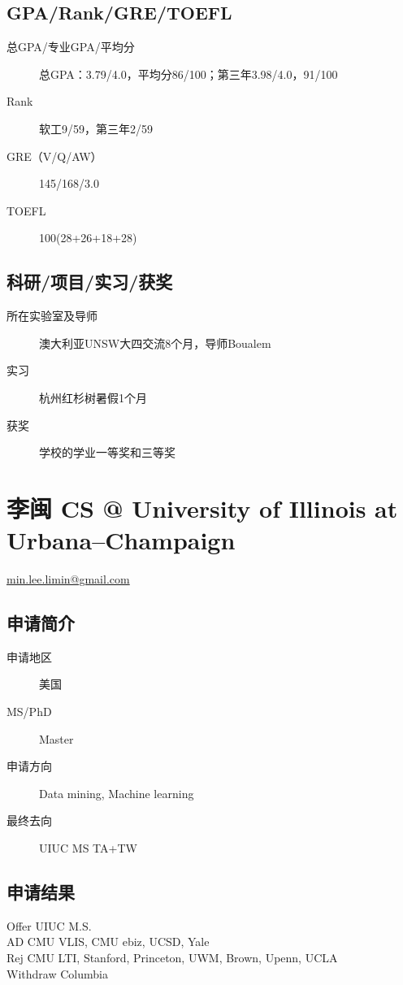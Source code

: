 \documentclass[11pt,fleqn,openany]{book} %
\begin{document}
\subsection*{GPA/Rank/GRE/TOEFL}
\begin{description}
\item[总GPA/专业GPA/平均分] 总GPA：3.79/4.0，平均分86/100；第三年3.98/4.0，91/100
\item[Rank] 软工9/59，第三年2/59
\item[GRE（V/Q/AW）] 145/168/3.0
\item[TOEFL] 100(28+26+18+28)
\end{description}

\subsection*{科研/项目/实习/获奖}
\begin{description}
\item[所在实验室及导师] 澳大利亚UNSW大四交流8个月，导师Boualem
\item[实习] 杭州红杉树暑假1个月
\item[获奖] 学校的学业一等奖和三等奖
\end{description}
\clearpage
\section{李闽 CS @ University of Illinois at Urbana--Champaign}
\hfill \href{mailto:min.lee.limin@gmail.com}{min.lee.limin@gmail.com}

\noindent\begin{minipage}[t]{0.45\textwidth}
\subsection*{申请简介}
\begin{description}
\item[申请地区] 美国
\item[MS/PhD] Master
\item[申请方向] Data mining, Machine learning
\item[最终去向] UIUC MS TA+TW
\end{description}
\end{minipage}
\hfill
\begin{minipage}[t]{0.45\textwidth}
\subsection*{申请结果}
\noindent Offer UIUC M.S.\\
AD CMU VLIS, CMU ebiz, UCSD, Yale\\
Rej CMU LTI, Stanford, Princeton, UWM, Brown, Upenn, UCLA\\
Withdraw Columbia
\end{minipage}
\end{document}

